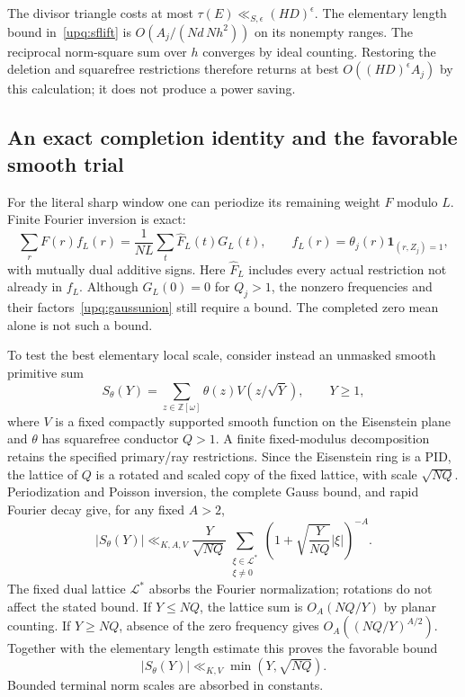 The divisor triangle costs at most
$\tau(E)\ll_{S,\epsilon}(HD)^\epsilon$.
The elementary length bound in~\eqref{upq:sflift} is
$O(A_j/(Nd\,Nh^2))$ on its nonempty ranges. The reciprocal
norm-square sum over $h$ converges by ideal counting. Restoring the
deletion and squarefree restrictions therefore returns at best
$O((HD)^\epsilon A_j)$ by this calculation; it does not produce a power
saving.

\subsection{An exact completion identity and the favorable smooth trial}
For the literal sharp window one can periodize its remaining weight
$F$ modulo $L$. Finite Fourier inversion is exact:
\[
 \sum_r F(r)f_L(r)
 =\frac1{NL}\sum_t\widehat F_L(t)G_L(t),
 \qquad
 f_L(r)=\theta_j(r)\mathbf1_{(r,Z_j)=1},
\]
with mutually dual additive signs. Here $\widehat F_L$ includes every
actual restriction not already in $f_L$.
Although $G_L(0)=0$ for $Q_j>1$, the nonzero frequencies and
their factors~\eqref{upq:gaussunion} still require a bound.
The completed zero mean alone is not such a bound.

To test the best elementary local scale, consider instead an unmasked
smooth primitive sum
\[
 S_\theta(Y)=\sum_{z\in\mathbb Z[\omega]}
       \theta(z)V(z/\sqrt Y),\qquad Y\ge1,
\]
where $V$ is a fixed compactly supported smooth function on the
Eisenstein plane and $\theta$ has squarefree conductor $Q>1$.
A finite fixed-modulus decomposition retains the specified primary/ray
restrictions. Since the Eisenstein ring is a PID, the lattice of $Q$
is a rotated and scaled copy of the fixed lattice, with scale
$\sqrt{NQ}$. Periodization and Poisson inversion, the complete Gauss
bound, and rapid Fourier decay give, for any fixed $A>2$,
\[
 |S_\theta(Y)|
 \ll_{K,A,V}\frac{Y}{\sqrt{NQ}}
       \sum_{\substack{\xi\in\mathcal L^*\\\xi\ne0}}
       \left(1+\sqrt{\frac{Y}{NQ}}|\xi|\right)^{-A}.
\]
The fixed dual lattice $\mathcal L^*$ absorbs the Fourier normalization;
rotations do not affect the stated bound. If $Y\le NQ$, the lattice sum
is $O_A(NQ/Y)$ by planar counting. If $Y\ge NQ$, absence of the zero
frequency gives $O_A((NQ/Y)^{A/2})$. Together with the elementary
length estimate this proves the favorable bound
\begin{equation}\label{upq:smoothpoisson}
 |S_\theta(Y)|\ll_{K,V}\min(Y,\sqrt{NQ}).
\end{equation}
Bounded terminal norm scales are absorbed in constants.

